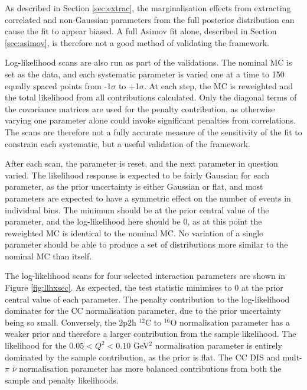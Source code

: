 As described in Section \ref{sec:extrac}, the marginalisation effects from extracting correlated and non-Gaussian parameters from the full posterior distribution can cause the fit to appear biased. A full Asimov fit alone, described in Section \ref{sec:asimov}, is therefore not a good method of validating the framework.

Log-likelihood scans are also run as part of the validations. The nominal MC is set as the data, and each systematic parameter is varied one at a time to 150 equally spaced points from -1$\sigma$ to +1$\sigma$. At each step, the MC is reweighted and the total likelihood from all contributions calculated. Only the diagonal terms of the covariance matrices are used for the penalty contribution, as otherwise varying one parameter alone could invoke significant penalties from correlations. The scans are therefore not a fully accurate measure of the sensitivity of the fit to constrain each systematic, but a useful validation of the framework.

After each scan, the parameter is reset, and the next parameter in question varied. The likelihood response is expected to be fairly Gaussian for each parameter, as the prior uncertainty is either Gaussian or flat, and most parameters are expected to have a symmetric effect on the number of events in individual bins. The minimum should be at the prior central value of the parameter, and the log-likelihood here should be 0, as at this point the reweighted MC is identical to the nominal MC. No variation of a single parameter should be able to produce a set of distributions more similar to the nominal MC than itself.

The log-likelihood scans for four selected interaction parameters are shown in Figure \ref{fig:llhxsec}. As expected, the test statistic minimises to 0 at the prior central value of each parameter. The penalty contribution to the log-likelihood dominates for the CC normalisation parameter, due to the prior uncertainty being so small. Conversely, the 2p2h $^{12}$C to $^{16}$O normalisation parameter has a weaker prior and therefore a larger contribution from the sample likelihood. The likelihood for the $0.05 < Q^2 < 0.10$ GeV$^2$ normalisation parameter is entirely dominated by the sample contribution, as the prior is flat. The CC DIS and mult-$\pi$ $\bar{\nu}$ normalisation parameter has more balanced contributions from both the sample and penalty likelihoods.

